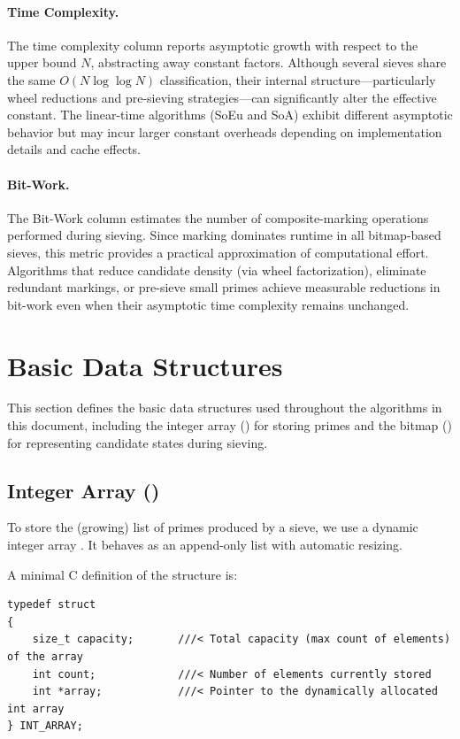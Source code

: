 \documentclass{article}
\begin{document}
\paragraph{Time Complexity.}
The time complexity column reports asymptotic growth with respect to the upper bound $N$, abstracting away constant factors. Although several sieves share the same $O(N \log \log N)$ classification, their internal structure—particularly wheel reductions and pre-sieving strategies—can significantly alter the effective constant. The linear-time algorithms (SoEu and SoA) exhibit different asymptotic behavior but may incur larger constant overheads depending on implementation details and cache effects.

\paragraph{Bit-Work.}
The Bit-Work column estimates the number of composite-marking operations performed during sieving. Since marking dominates runtime in all bitmap-based sieves, this metric provides a practical approximation of computational effort. Algorithms that reduce candidate density (via wheel factorization), eliminate redundant markings, or pre-sieve small primes achieve measurable reductions in bit-work even when their asymptotic time complexity remains unchanged.

\newpage
\appendix

\section{Basic Data Structures} \label{sec:data_structures}

This section defines the basic data structures used throughout the algorithms in this document, including the integer array () for storing primes and the bitmap () for representing candidate states during sieving.

\subsection{Integer Array ()} \label{sec:int_array}

To store the (growing) list of primes produced by a sieve, we use a dynamic integer array . It behaves as an append-only list with automatic resizing.

A minimal C definition of the  structure is:
\begin{verbatim}
typedef struct
{
    size_t capacity;       ///< Total capacity (max count of elements) of the array
    int count;             ///< Number of elements currently stored
    int *array;            ///< Pointer to the dynamically allocated int array
} INT_ARRAY;
\end{verbatim}
\end{document}
